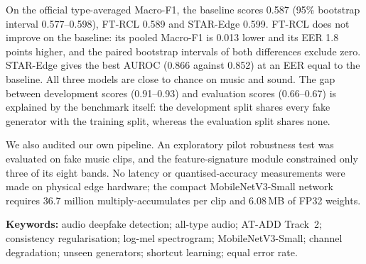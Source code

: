 \documentclass[12pt,a4paper]{report}
\begin{document}
On the official type-averaged Macro-F1, the baseline scores 0.587 (95\% bootstrap interval 0.577--0.598), FT-RCL 0.589 and STAR-Edge 0.599. FT-RCL does not improve on the baseline: its pooled Macro-F1 is 0.013 lower and its EER 1.8 points higher, and the paired bootstrap intervals of both differences exclude zero. STAR-Edge gives the best AUROC (0.866 against 0.852) at an EER equal to the baseline. All three models are close to chance on music and sound. The gap between development scores (0.91--0.93) and evaluation scores (0.66--0.67) is explained by the benchmark itself: the development split shares every fake generator with the training split, whereas the evaluation split shares none.

We also audited our own pipeline. An exploratory pilot robustness test was evaluated on fake music clips, and the feature-signature module constrained only three of its eight bands. No latency or quantised-accuracy measurements were made on physical edge hardware; the compact MobileNetV3-Small network requires 36.7 million multiply-accumulates per clip and 6.08\,MB of FP32 weights.

\endgroup

\vspace{0.3cm}
\noindent\textbf{Keywords:} audio deepfake detection; all-type audio; AT-ADD Track~2; consistency regularisation; log-mel spectrogram; MobileNetV3-Small; channel degradation; unseen generators; shortcut learning; equal error rate.

\clearpage

\clearpage

\clearpage

\clearpage
\end{document}
